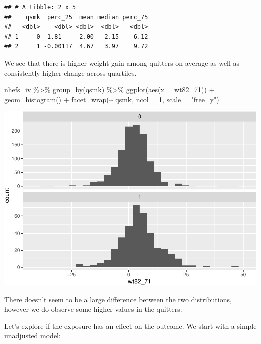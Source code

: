 \documentclass[
]{book}
\newenvironment{Shaded}{\begin{snugshade}}{\end{snugshade}}
\newcommand{\AttributeTok}[1]{\textcolor[rgb]{0.77,0.63,0.00}{#1}}
\newcommand{\DecValTok}[1]{\textcolor[rgb]{0.00,0.00,0.81}{#1}}
\newcommand{\FunctionTok}[1]{\textcolor[rgb]{0.00,0.00,0.00}{#1}}
\newcommand{\NormalTok}[1]{#1}
\newcommand{\SpecialCharTok}[1]{\textcolor[rgb]{0.00,0.00,0.00}{#1}}
\newcommand{\StringTok}[1]{\textcolor[rgb]{0.31,0.60,0.02}{#1}}
\begin{document}
\begin{verbatim}
## # A tibble: 2 x 5
##    qsmk  perc_25  mean median perc_75
##   <dbl>    <dbl> <dbl>  <dbl>   <dbl>
## 1     0 -1.81     2.00   2.15    6.12
## 2     1 -0.00117  4.67   3.97    9.72
\end{verbatim}

We see that there is higher weight gain among quitters on average as well as consistently higher change across quartiles.

\begin{Shaded}
\begin{Highlighting}[]
\NormalTok{nhefs\_iv }\SpecialCharTok{\%\textgreater{}\%} 
  \FunctionTok{group\_by}\NormalTok{(qsmk) }\SpecialCharTok{\%\textgreater{}\%}
  \FunctionTok{ggplot}\NormalTok{(}\FunctionTok{aes}\NormalTok{(}\AttributeTok{x =}\NormalTok{ wt82\_71)) }\SpecialCharTok{+} 
  \FunctionTok{geom\_histogram}\NormalTok{() }\SpecialCharTok{+} 
  \FunctionTok{facet\_wrap}\NormalTok{(}\SpecialCharTok{\textasciitilde{}}\NormalTok{ qsmk, }\AttributeTok{ncol =} \DecValTok{1}\NormalTok{, }\AttributeTok{scale =} \StringTok{"free\_y"}\NormalTok{)}
\end{Highlighting}
\end{Shaded}

\includegraphics{adv_epi_analysis_files/figure-latex/unnamed-chunk-312-1.pdf}

There doesn't seem to be a large difference between the two distributions, however we do observe some higher values in the quitters.

Let's explore if the exposure has an effect on the outcome. We start with a simple unadjusted model:
\end{document}
